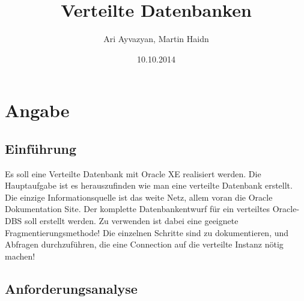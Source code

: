 \documentclass[12pt,a4paper,draft]{report}
\date{10.10.2014}
\author{Ari Ayvazyan, Martin Haidn}
\title{Verteilte Datenbanken}
\begin{document}
\maketitle
\tableofcontents
	\chapter{Angabe}
	\section{Einführung}
	
	Es soll eine Verteilte Datenbank mit Oracle XE realisiert werden. Die Hauptaufgabe ist es herauszufinden wie man eine verteilte Datenbank erstellt. Die einzige Informationsquelle ist das weite Netz, allem voran die Oracle Dokumentation Site. Der komplette Datenbankentwurf für ein
	verteiltes Oracle-DBS soll erstellt werden. Zu verwenden ist dabei eine geeignete
	Fragmentierungsmethode! Die einzelnen Schritte sind zu dokumentieren, und Abfragen
	durchzuführen, die eine Connection auf die verteilte Instanz nötig machen!
	\section{Anforderungsanalyse}
	
\end{document}

